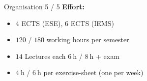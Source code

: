 
\begin{frame}{Organisation 5 / 5}
  \textbf{Effort:}
  \begin{itemize}
    \item
      {\color{MainA}$\num{4}$ ECTS} (ESE),
      {\color{MainA}$\num{6}$ ECTS} (IEMS)
    \item
      {\color{MainA}$\num{120}$} /
      {\color{MainA}$\num{180}$}
      working hours per semester
    \item
      {\color{MainA}$\num{14}$} Lectures each
      {\color{MainA}$\SI{6}{\hour}$} /
      {\color{MainA}$\SI{8}{\hour}$} + exam
    \item
      {\color{MainA}$\SI{4}{\hour}$} /
      {\color{MainA}$\SI{6}{\hour}$} per exercise-sheet (one per week)
  \end{itemize}
\end{frame}
